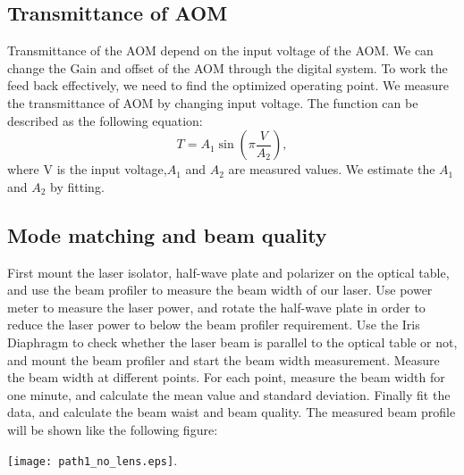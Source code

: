 \subsection{Transmittance of AOM}
Transmittance of the AOM depend on the input voltage of the AOM. We can change the Gain and offset of the AOM through the digital system. To work the feed back effectively, we need to find the optimized operating point. We measure the transmittance of AOM by changing input voltage. The function can be described as the following equation:
\begin{equation}
T=A_1 \sin{\left( \pi \frac{V}{A_2}\right)},
\end{equation}
where V is the input voltage,$ A_1$ and $A_2$ are measured values. We estimate the $A_1$ and $A_2$ by fitting.
			\begin{center}
                                                   \end{center}

\subsection{Mode matching and beam quality}
First mount the laser isolator, half-wave plate and polarizer on the optical table, and use the \underline{\qquad\qquad} beam profiler to measure the beam width of our laser. Use power meter to measure the laser power, and rotate the half-wave plate in order to reduce the laser power to below the beam profiler requirement. Use the Iris Diaphragm to check whether the laser beam is parallel to the optical table or not, and mount the beam profiler and start the beam width measurement. Measure the beam width at different points. For each point, measure the beam width for one minute, and calculate the mean value and standard deviation. Finally fit the data, and calculate the beam waist and beam quality. The measured beam profile will be shown like the following figure:

\texttt{[image: path1\_no\_lens.eps]}.

